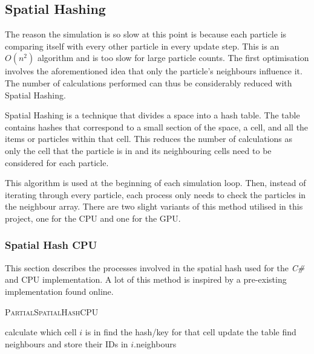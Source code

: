 \documentclass[12pt]{article}
\begin{document}
    \subsection{Spatial Hashing}

    The reason the simulation is so slow at this point is because each particle is comparing itself with every other particle in every update step. This is an $O(n^2)$ algorithm and is too slow for large particle counts. The first optimisation involves the aforementioned idea that only the particle's neighbours influence it. The number of calculations performed can thus be considerably reduced with Spatial Hashing.

    Spatial Hashing is a technique that divides a space into a hash table. The table contains hashes that correspond to a small section of the space, a cell, and all the items or particles within that cell\cite{spatialpython}. This reduces the number of calculations as only the cell that the particle is in and its neighbouring cells need to be considered for each particle. 
    
    This algorithm is used at the beginning of each simulation loop. Then, instead of iterating through every particle, each process only needs to check the particles in the neighbour array. There are two slight variants of this method utilised in this project, one for the CPU and one for the GPU.

    \subsubsection{Spatial Hash CPU}

    This section describes the processes involved in the spatial hash used for the \textit{C\#} and CPU implementation. A lot of this method is inspired by a pre-existing implementation found online\cite{sphspatialexample}.

    \begin{algorithm}[H]
        \caption{\textsc{PartialSpatialHashCPU}}
    
        \begin{algorithmic}[1]
                \State calculate which cell $i$ is in
                \State find the hash/key for that cell
            \EndFor
                \State update the table
            \EndFor
                \State find neighbours and store their IDs in $i$.neighbours
            \EndFor
        \end{algorithmic}
    \end{algorithm}
\end{document}
